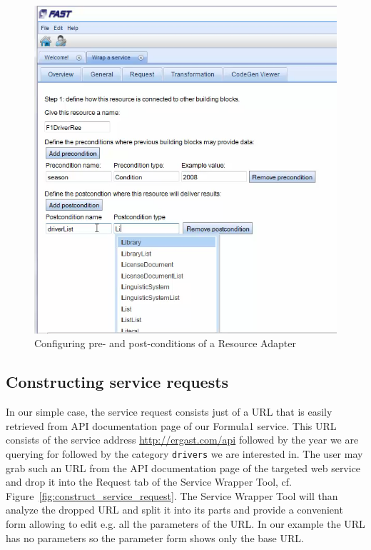 \documentclass{fast_latex}
\begin{document}
\begin{figure}
  \begin{center} \includegraphics[width=\linewidth]{images/ServiceWrapperToolGVSWithPrePostConds.png}
    \caption{Configuring pre- and post-conditions of a Resource Adapter}
    \label{fig:construct_pre_post_conditions}
  \end{center}
\end{figure}


\subsection{Constructing service requests} %
\label{sub:constructing_service_requests}

In our simple case, the service request consists just of a URL that is easily retrieved from API documentation page of our Formula1 service. This URL consists of the service address \url{http://ergast.com/api} followed by the year we are querying for followed by the category \verb|drivers| we are interested in. The user may grab such an URL from the API documentation page of the targeted web service and drop it into the Request tab of the Service Wrapper Tool, cf. Figure~\ref{fig:construct_service_request}. The Service Wrapper Tool will than analyze the dropped URL and split it into its parts and provide a convenient form allowing to edit e.g. all the parameters of the URL. In our example the URL has no parameters so the parameter form shows only the base URL. 
\end{document}
